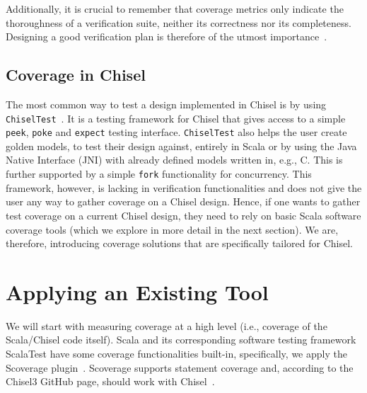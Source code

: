 \documentclass[conference]{IEEEtran}
\newcommand{\martin}[1]{{\color{blue} Martin: #1}}
\begin{document}
Additionally, it is crucial to remember that coverage metrics only indicate the thoroughness of a verification suite, neither its correctness nor its completeness. Designing a good verification plan is therefore of the utmost importance~\cite{hdlverify}. %

\subsection{Coverage in Chisel} 
The most common way to test a design implemented in Chisel is by using \texttt{ChiselTest}~\cite{chisel:tester2}. 
It is a testing framework for Chisel that gives access to a simple \texttt{peek}, \texttt{poke} and \texttt{expect} testing interface. 
\texttt{ChiselTest} also helps the user create golden models, to test their design against, entirely in Scala or by using the Java Native Interface (JNI) with already defined models written in, e.g., C. This is further supported by a simple \texttt{fork} functionality for concurrency.  
This framework, however, is lacking in verification functionalities and does not give the user any way to gather coverage on a Chisel design.
Hence, if one wants to gather test coverage on a current Chisel design, they need to rely on basic Scala software coverage tools (which we explore in more detail in the next section). 
We are, therefore, introducing coverage solutions that are specifically tailored for Chisel.

\section{Applying an Existing Tool}
We will start with measuring coverage at a high level (i.e., coverage of the Scala/Chisel code itself). Scala and its corresponding software testing framework ScalaTest have some coverage functionalities built-in, specifically, we apply the Scoverage plugin~\cite{scoverage}. Scoverage supports statement coverage and, according to the Chisel3 GitHub page, should work with Chisel~\cite{chisel:scoverage}.

\end{document}
